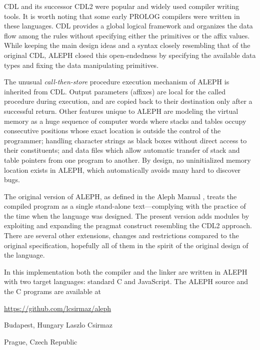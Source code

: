 \documentclass[titlepage]{article}
\newcommand\A{\textsf{ALEPH}}
\newcommand\g[1]{\textsf{\color{blue!90!black}#1}}
\begin{document}
\g{CDL} and its successor \g{CDL2} were popular and widely used compiler
writing tools. It is worth noting that some early \g{PROLOG}
compilers were written in these languages. \g{CDL} provides a
global logical framework and organizes the data flow among the rules without
specifying either the primitives or the affix values. While keeping the
main design ideas and a syntax closely resembling that of the original
\g{CDL}, \A{} closed this open-endedness by specifying the available
data types and fixing the data manipulating primitives.

The unusual \emph{call-then-store} procedure execution mechanism of \A{} is
inherited from \g{CDL}. Output parameters (affixes) are local for the called
procedure during execution, and are copied back to their destination only
after a successful return. Other features unique to \A{} are modeling the
virtual memory as a huge sequence of computer words where stacks and tables
occupy consecutive positions whose exact location is outside the control of
the programmer; handling character strings as black boxes without direct
access to their constituents; and data files which allow automatic transfer of
stack and table pointers from one program to another. By design, no
uninitialized memory location exists in \A, which automatically avoids many
hard to discover bugs.

The original version of \A, as defined in the Aleph Manual \cite{A-manual},
treats the compiled program as a single stand-alone text---complying with the
practice of the time when the language was designed. The present version
adds modules by exploiting and expanding the \g{pragmat} construct
resembling the \g{CDL2} approach. There are several other extensions,
changes and restrictions compared to the original specification, hopefully
all of them in the spirit of the original design of the language.

\smallskip

In this implementation both the compiler and the linker are written in \A
with two target languages: standard {\sf C} and JavaScript. The \A{} 
source and the {\sf C} programs are available at
\begin{center}
\url{https://github.com/lcsirmaz/aleph}
\end{center}

\vskip 20pt

\noindent
Budapest, Hungary \hfill Laszlo Csirmaz

\noindent
Prague, Czech Republic

\tableofcontents
\newpage
\end{document}
